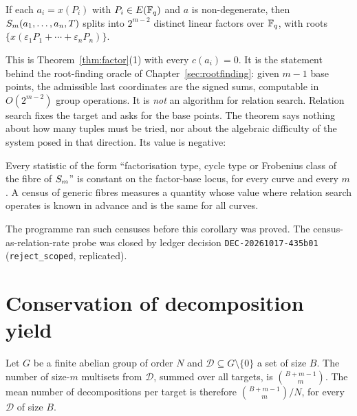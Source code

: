 \begin{theorem}\label{thm:fbsplit}
If each $a_i=x(P_i)$ with $P_i\in E(\mathbb{F}_q)$ and $a$ is non-degenerate, then
$S_{m}(a_1,\ldots,a_n,T)$ splits into $2^{m-2}$ distinct linear factors
over $\mathbb{F}_q$, with roots $\{x(\varepsilon_1P_1+\cdots+\varepsilon_nP_n)\}$.
\end{theorem}

This is Theorem~\ref{thm:factor}(1) with every $c(a_i)=0$. It is the
statement behind the root-finding oracle of Chapter~\ref{sec:rootfinding}:
given $m-1$ base points, the admissible last coordinates are the signed
sums, computable in $O(2^{m-2})$ group operations. It is \emph{not} an
algorithm for relation search. Relation search fixes the target and asks
for the base points. The theorem says nothing about how many tuples must
be tried, nor about the algebraic difficulty of the system posed in that
direction. Its value is negative:

\begin{corollary}\label{cor:census}
Every statistic of the form ``factorisation type, cycle type or Frobenius
class of the fibre of $S_{m}$'' is constant on the factor-base locus, for
every curve and every $m$. A census of generic fibres measures a quantity
whose value where relation search operates is known in advance and is the
same for all curves.
\end{corollary}

The programme ran such censuses before this corollary was proved. The
census-as-relation-rate probe was closed by ledger decision
\texttt{DEC-20261017-435b01} (\texttt{reject\_scoped}, replicated).

\section{Conservation of decomposition yield}

\begin{proposition}[Conservation]\label{prop:conservation}
Let $G$ be a finite abelian group of order $N$ and
$\mathcal D\subseteq G\setminus\{0\}$ a set of size $B$. The number of
size-$m$ multisets from $\mathcal D$, summed over all targets, is
$\binom{B+m-1}{m}$. The mean number of decompositions per target is
therefore $\binom{B+m-1}{m}/N$, for every $\mathcal D$ of size $B$.
\end{proposition}

